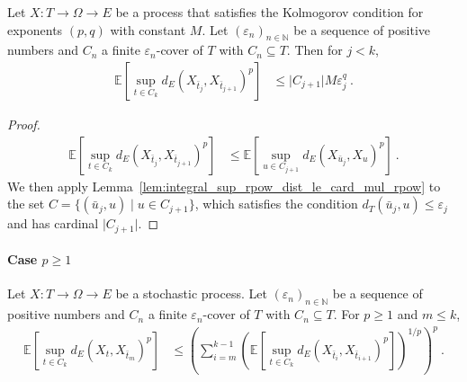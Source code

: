 \begin{lemma}\label{lem:integral_sup_rpow_dist_succ}
  \leanok
Let $X : T \to \Omega \to E$ be a process that satisfies the Kolmogorov condition for exponents $(p,q)$ with constant $M$.
Let $(\varepsilon_n)_{n \in \mathbb{N}}$ be a sequence of positive numbers and $C_n$ a finite $\varepsilon_n$-cover of $T$ with $C_n \subseteq T$.
Then for $j < k$,
\begin{align*}
  \mathbb{E}\left[\sup_{t \in C_k} d_E(X_{\bar{t}_j}, X_{\bar{t}_{j+1}})^p \right]
  &\le \vert C_{j+1} \vert M \varepsilon_j^q
  \: .
\end{align*}
\end{lemma}

\begin{proof}\leanok
\begin{align*}
  \mathbb{E}\left[\sup_{t \in C_k} d_E(X_{\bar{t}_j}, X_{\bar{t}_{j+1}})^p \right]
  &\le \mathbb{E}\left[\sup_{u \in C_{j+1}} d_E(X_{\bar{u}_j}, X_{u})^p \right]
  \: .
\end{align*}
We then apply Lemma~\ref{lem:integral_sup_rpow_dist_le_card_mul_rpow} to the set $C = \{(\bar{u}_j, u) \mid u \in C_{j+1}\}$, which satisfies the condition $d_T(\bar{u}_j, u) \le \varepsilon_j$ and has cardinal $\vert C_{j+1} \vert$.
\end{proof}



\paragraph{Case $p \ge 1$}


\begin{lemma}\label{lem:integral_sup_dist_le_sum_rpow}
  \leanok
Let $X : T \to \Omega \to E$ be a stochastic process.
Let $(\varepsilon_n)_{n \in \mathbb{N}}$ be a sequence of positive numbers and $C_n$ a finite $\varepsilon_n$-cover of $T$ with $C_n \subseteq T$.
For $p \ge 1$ and $m \le k$,
\begin{align*}
  \mathbb{E}\left[\sup_{t \in C_k} d_E(X_t, X_{\bar{t}_m})^p \right]
  &\le \left(\sum_{i=m}^{k-1} \left( \mathbb{E}\left[\sup_{t \in C_k} d_E(X_{\bar{t}_i}, X_{\bar{t}_{i+1}})^p\right] \right)^{1/p}\right)^p
  \: .
\end{align*}
\end{lemma}

